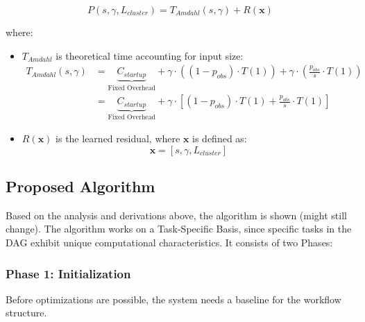 \documentclass[a4paper, 12pt]{article}
\begin{document}
	\[
	P(s, \gamma, L_{cluster}) = T_{Amdahl}(s, \gamma) + R(\mathbf{x})
	\]
	
	where:
	\begin{itemize}
		\item $T_{Amdahl}$ is theoretical time accounting for input size:
		\begin{align*}
			T_{Amdahl}(s, \gamma) &= \underbrace{C_{startup}}_{\text{Fixed Overhead}} + \gamma \cdot \left((1 - p_{obs}) \cdot T(1)\right) + \gamma \cdot \left(\frac{p_{obs}}{s} \cdot T(1)\right) \\[7pt]
			 &= \underbrace{C_{startup}}_{\text{Fixed Overhead}} + \gamma \cdot \left[ (1 - p_{obs}) \cdot T(1) + \frac{p_{obs}}{s} \cdot T(1) \right]
		\end{align*}
		\item $R(\mathbf{x})$ is the learned residual, where $\mathbf{x}$ is defined as:
		\[
		\mathbf{x} = \left[s, \gamma, L_{cluster}\right]
		\]
		
	\end{itemize}
	
	\subsection*{Proposed Algorithm}
	
	Based on the analysis and derivations above, the algorithm is shown (might still change). The algorithm works on a Task-Specific Basis, since specific tasks in the DAG exhibit unique computational characteristics.	 It consists of two Phases:
	
	\subsubsection*{Phase 1: Initialization}
	Before optimizations are possible, the system needs a baseline for the workflow structure.
	
\end{document}
